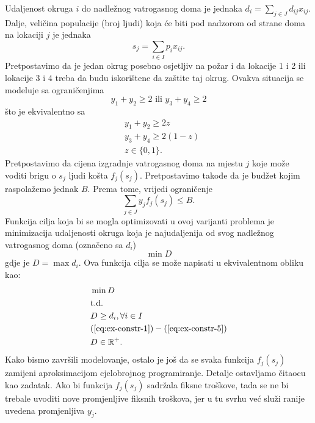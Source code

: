 \documentclass[b5paper, utf8, 11pt, colorlinks]{book}
\theoremstyle{definition}
\begin{document}
Udaljenost okruga $i$ do nadležnog vatrogasnog doma je jednaka $d_i = \sum_{j \in J} d_{ij}x_{ij} $. Dalje, veličina populacije (broj ljudi) koja će biti pod nadzorom od strane doma na lokaciji $j$ je jednaka 
\begin{equation}\label{eq:ex-constr-3}
	s_j = \sum_{i \in I} p_i x_{ij}. 
\end{equation}
Pretpostavimo da je jedan okrug posebno osjetljiv na požar i da lokacije  1 i 2 ili lokacije 3 i 4 treba  da budu iskorištene da zaštite taj okrug. Ovakva situacija se modeluje sa ograničenjima
\begin{equation*} 
	y_1 + y_2 \geq 2 \mbox{ ili } y_3 + y_4 \geq 2
\end{equation*}
što je ekvivalentno sa 
\begin{align}
	&y_1 + y_2 \geq 2 z \nonumber \\
	&y_3 + y_4 \geq 2 (1-z) \nonumber \\
	& z\in \{0, 1 \}.\label{eq:ex-constr-4}
\end{align}
Pretpostavimo da cijena izgradnje vatrogasnog doma na mjestu $j$ koje može voditi brigu o $s_j$ ljudi košta $f_j(s_j)$. Pretpostavimo takođe da je budžet kojim raspolažemo jednak $B$. Prema tome, vrijedi ograničenje
\begin{equation}\label{eq:ex-constr-5}
	\sum_{j \in J} y_j f_j(s_j) \leq B.
\end{equation}
Funkcija cilja koja bi se mogla optimizovati u ovoj varijanti problema je minimizacija udaljenosti 
okruga koja je najudaljenija od svog nadležnog vatrogasnog doma (označeno sa $d_i$)
$$\min D $$
gdje je $D= \max d_i$. Ova funkcija cilja se može napisati  u ekvivalentnom obliku kao:
\begin{align*}
	&\min D \\     
	&  \mbox{t.d.} \\
	& D \geq d_i,  \forall i \in I \\
	&(\ref{eq:ex-constr-1})-(\ref{eq:ex-constr-5}) \\
	& D \in \mathbb{R}^+. 
\end{align*}
Kako bismo završili modelovanje, ostalo je još da se svaka funkcija $f_j (s_j)$ zamijeni aproksimacijom cjelobrojnog programiranje. Detalje ostavljamo čitaocu kao zadatak. Ako bi funkcija $f_j (s_j)$ sadržala fiksne troškove, tada se ne bi trebale uvoditi nove promjenljive fiksnih troškova, jer u tu svrhu već služi ranije uvedena promjenljiva $y_j$. 
\end{document}
